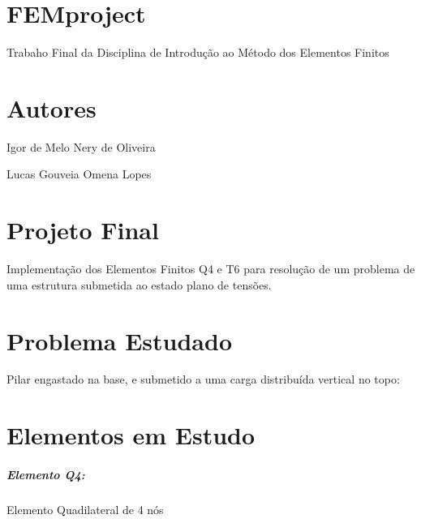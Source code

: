 \section*{F\+E\+Mproject}

Trabaho Final da Disciplina de Introdução ao Método dos Elementos Finitos

\section*{Autores}


\begin{DoxyItemize}
\item Igor de Melo Nery de Oliveira
\item Lucas Gouveia Omena Lopes
\end{DoxyItemize}

\section*{Projeto Final}


\begin{DoxyItemize}
\item Implementação dos Elementos Finitos Q4 e T6 para resolução de um problema de uma estrutura submetida ao estado plano de tensões.
\end{DoxyItemize}

\section*{Problema Estudado}

Pilar engastado na base, e submetido a uma carga distribuída vertical no topo\+:

\subsection*{}

\section*{Elementos em Estudo}

\subparagraph*{Elemento Q4\+:}


\begin{DoxyItemize}
\item Elemento Quadilateral de 4 nós
\end{DoxyItemize}

\subsection*{}

